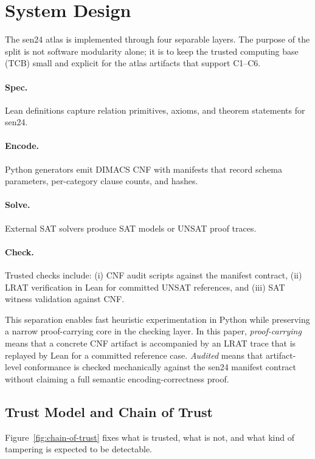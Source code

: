 \section{System Design}

The sen24 atlas is implemented through four separable layers. The purpose of the split is not software modularity alone; it is to keep the trusted computing base (TCB) small and explicit for the atlas artifacts that support C1--C6.

\paragraph{Spec.}
Lean definitions capture relation primitives, axioms, and theorem statements for sen24.

\paragraph{Encode.}
Python generators emit DIMACS CNF with manifests that record schema parameters, per-category clause counts, and hashes.

\paragraph{Solve.}
External SAT solvers produce SAT models or UNSAT proof traces.

\paragraph{Check.}
Trusted checks include: (i) CNF audit scripts against the manifest contract, (ii) LRAT verification in Lean for committed UNSAT references, and (iii) SAT witness validation against CNF.

This separation enables fast heuristic experimentation in Python while preserving a narrow proof-carrying core in the checking layer.
In this paper, \emph{proof-carrying} means that a concrete CNF artifact is accompanied by an LRAT trace that is replayed by Lean for a committed reference case.
\emph{Audited} means that artifact-level conformance is checked mechanically against the sen24 manifest contract without claiming a full semantic encoding-correctness proof.

\subsection{Trust Model and Chain of Trust}

Figure~\ref{fig:chain-of-trust} fixes what is trusted, what is not, and what kind of tampering is expected to be detectable.

